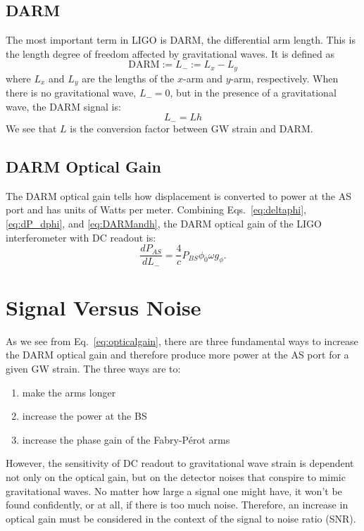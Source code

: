 \subsection{DARM}
The most important term in LIGO is DARM, the differential arm length. This
is the length degree of freedom affected by gravitational waves. It is
defined as
\begin{equation}
\mathrm{DARM} := L_- := L_x - L_y
\end{equation}
where $L_x$ and $L_y$ are the lengths of the $x$-arm and $y$-arm,
respectively. When there is no gravitational wave, $L_-=0$, but in the
presence of a gravitational wave, the DARM signal is:
\begin{equation}
L_- = Lh
\label{eq:DARMandh}
\end{equation}
We see that $L$ is the conversion factor between GW strain and DARM.



\subsection{DARM Optical Gain}
The DARM optical gain tells how displacement is converted to power at
the AS port and has units of Watts per meter. Combining
Eqs.~\ref{eq:deltaphi}, \ref{eq:dP_dphi}, and \ref{eq:DARMandh}, the
DARM optical gain of the LIGO interferometer with DC readout is:
\begin{equation}
\frac{d P_{AS}}{dL_-} = \frac{4}{c} P_{BS} \phi_0 \omega g_{\phi}.
\label{eq:opticalgain}
\end{equation}




\section{Signal Versus Noise} 
As we see from Eq.~\ref{eq:opticalgain}, there are three fundamental
ways to increase the DARM optical gain and therefore produce more
power at the AS port for a given GW strain. The three ways are to:
\begin{enumerate}
\item make the arms longer \vspace{-10 pt}
\item increase the power at the BS \vspace{-10 pt}
\item increase the phase gain of the Fabry-P\'{e}rot arms
\end{enumerate}
However, the sensitivity of DC readout to gravitational wave strain is
dependent not only on the optical gain, but on the detector noises
that conspire to mimic gravitational waves. No matter how large a
signal one might have, it won't be found confidently, or at all, if
there is too much noise. Therefore, an increase in optical gain must
be considered in the context of the signal to noise ratio (SNR).

